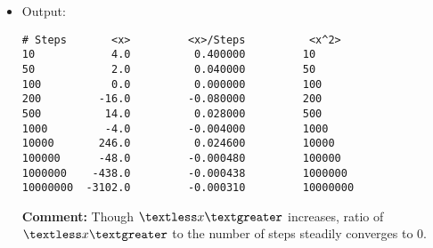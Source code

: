 \documentclass[10pt]{article}
\begin{document}
\begin{itemize}
\begin{verbatim}
                for(t = 0; t < NUMSTEPS; t++)
                {
                        epsilon = rand()/(RAND_MAX + 1.0);
                        
                        if(epsilon <= 0.5)
                                epsilon = -1.0;
                        else
                                epsilon = 1.0;

                        xavg[i] += epsilon;
                        
                        x2avg[i] += epsilon * epsilon;

                }
        }
        
        printf("# Steps       <x>          <x^2>\n");

        for(i = 0; i < 10; i++)
        {
                printf("%.0f        %.1f    %.1f          %.0f\n", array[i], xavg[i], xavg[i] / array[i], x2avg[i]);
        }

return 0;	
}
\end{verbatim}
\item Output:
\begin{verbatim}
# Steps       <x>         <x>/Steps          <x^2>
10            4.0          0.400000         10
50            2.0          0.040000         50
100           0.0          0.000000         100
200         -16.0         -0.080000         200
500          14.0          0.028000         500
1000         -4.0         -0.004000         1000
10000       246.0          0.024600         10000
100000      -48.0         -0.000480         100000
1000000    -438.0         -0.000438         1000000
10000000  -3102.0         -0.000310         10000000
\end{verbatim}
\textbf{Comment:} Though  $\textless x \textgreater$ increases, ratio of $\textless x \textgreater$ to the number of steps steadily converges to 0.
\end{itemize}
\end{document}
